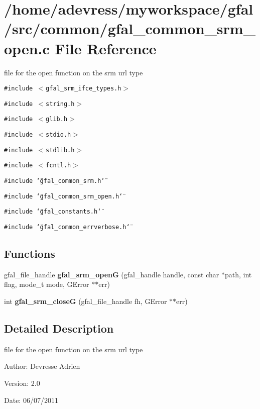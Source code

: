 \section{/home/adevress/myworkspace/gfal/src/common/gfal\_\-common\_\-srm\_\-open.c File Reference}
\label{gfal__common__srm__open_8c}
file for the open function on the srm url type 

{\tt \#include $<$gfal\_\-srm\_\-ifce\_\-types.h$>$}\par
{\tt \#include $<$string.h$>$}\par
{\tt \#include $<$glib.h$>$}\par
{\tt \#include $<$stdio.h$>$}\par
{\tt \#include $<$stdlib.h$>$}\par
{\tt \#include $<$fcntl.h$>$}\par
{\tt \#include \char`\"{}gfal\_\-common\_\-srm.h\char`\"{}}\par
{\tt \#include \char`\"{}gfal\_\-common\_\-srm\_\-open.h\char`\"{}}\par
{\tt \#include \char`\"{}gfal\_\-constants.h\char`\"{}}\par
{\tt \#include \char`\"{}gfal\_\-common\_\-errverbose.h\char`\"{}}\par
\subsection*{Functions}
\begin{CompactItemize}
\item 
gfal\_\-file\_\-handle \textbf{gfal\_\-srm\_\-open\-G} (gfal\_\-handle handle, const char $\ast$path, int flag, mode\_\-t mode, GError $\ast$$\ast$err)\label{gfal__common__srm__open_8c_bb27bc48091a2a9a4ca124a35d3847a5}

\item 
int \textbf{gfal\_\-srm\_\-close\-G} (gfal\_\-file\_\-handle fh, GError $\ast$$\ast$err)\label{gfal__common__srm__open_8c_1b78856858fbfc8244d098fef0231d7d}

\end{CompactItemize}


\subsection{Detailed Description}
file for the open function on the srm url type 

\begin{Desc}
\item[Author:]Devresse Adrien \end{Desc}
\begin{Desc}
\item[Version:]2.0 \end{Desc}
\begin{Desc}
\item[Date:]06/07/2011 \end{Desc}
